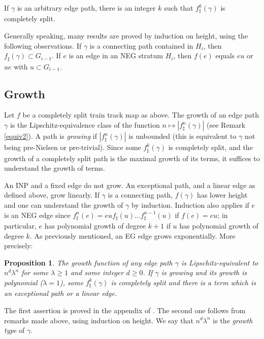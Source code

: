 \documentclass[11pt]{amsart}
\newtheorem{prop}[thm]{Proposition}
\theoremstyle{remark}
\newcommand{\inc}{\subset}
\begin{document}
If $\gamma$ is an arbitrary edge path, there is an integer $k$ such that $f^k_\sharp(\gamma )$ is completely split.

Generally speaking, many results are proved by induction on height, using the following observations. If $\gamma$ is a connecting path contained in $H_i$, then $f_\sharp(\gamma)\inc G_{i-1}$. If $e$ is an edge in an    NEG stratum $H_i$, then $f(e)$ equals $eu$ or $ue$ with $u\inc G_{i-1}$.


\subsection{Growth 
}
 
 Let $f$ be a completely split train track map as above.
The growth of an edge  path $\gamma$ is the Lipschitz-equivalence class of the function 
$n\mapsto  | f^n_\sharp(\gamma) | $
(see Remark \ref{equiv2}). A path is \emph{growing} if 
$| f^n_\sharp(\gamma) | $
is unbounded (this is equivalent to $\gamma$ not being pre-Nielsen   or pre-trivial). 
Since some $f^k_\sharp(\gamma )$ is completely split, and the growth of a completely split path is the maximal growth of its terms, it suffices to understand the growth of  terms. 

An INP
 and 
a fixed edge do  not grow. An  
exceptional path, and a linear edge as defined above,  grow linearly. If $\gamma$ is a connecting path, $f(\gamma)$ has lower height and one can understand the growth of $\gamma$ by induction. Induction also applies if $e$ is an NEG edge   since  $f^n_\sharp(e)=euf_\sharp(u)\dots f^{n-1}_\sharp(u)$ if $f(e)=eu$; in particular, $e$ has polynomial growth of degree $k+1$ if $u$ has polynomial growth of degree $k$. As previously mentioned, an   EG edge grows exponentially. More precisely:

\begin{prop} \label{growth}
The growth function of any edge    path $\gamma$ is Lipschitz-equivalent to $n^d\lambda^n $ for some $\lambda\ge1$ and some integer $d\ge0$. If $\gamma$ is growing and its growth is polynomial ($\lambda=1$),   
some $f^k_\sharp(\gamma)$ is completely split and there is  a term which is an exceptional path or a linear edge. 
\end{prop}
 
 The first assertion is proved in the appendix of \cite{counting}. The second one follows from remarks made above, using induction on height. 
  We say that $n^d\lambda^n $ is the \emph{growth type} of $\gamma$.
 
\end{document}
